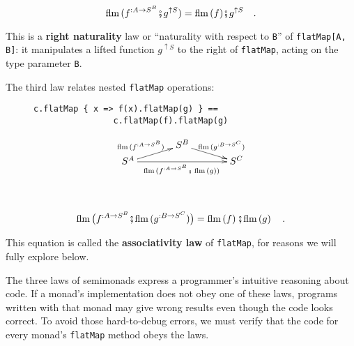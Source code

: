 \noindent \vspace{-0.35\baselineskip}
\begin{equation}
\text{flm}\,(f^{:A\rightarrow S^{B}}\bef g^{\uparrow S})=\text{flm}\,(f)\bef g^{\uparrow S}\quad.\label{eq:right-naturality-law-flatMap}
\end{equation}

\noindent This is a \textbf{right
naturality} law or \textsf{``}naturality with respect to \lstinline!B!\textsf{''}
of \lstinline!flatMap[A, B]!: it manipulates a lifted function $g^{\uparrow S}$
to the right of \lstinline!flatMap!, acting on the type parameter
\lstinline!B!.

The third law relates nested \lstinline!flatMap! operations:

\begin{wrapfigure}{l}{0.4\columnwidth}%
\vspace{-0.6\baselineskip}

\begin{lstlisting}
c.flatMap { x => f(x).flatMap(g) } ==
                c.flatMap(f).flatMap(g)
\end{lstlisting}
\vspace{0\baselineskip}
\[
\xymatrix{\xyScaleY{0.2pc}\xyScaleX{3pc} & S^{B}\ar[rd]\sp(0.5){~\ \text{flm}\,(g^{:B\rightarrow S^{C}})}\\
S^{A}\ar[ru]\sp(0.5){\text{flm}\,(f^{:A\rightarrow S^{B}})~~\ }\ar[rr]\sb(0.5){\text{flm}\,(f^{:A\rightarrow S^{B}}\bef\,\text{flm}\,(g))\,} &  & S^{C}
}
\]

\vspace{0.6\baselineskip}
\end{wrapfigure}%
~\vspace{-1.6\baselineskip}

\begin{equation}
\text{flm}\,\big(f^{:A\rightarrow S^{B}}\bef\text{flm}\,(g^{:B\rightarrow S^{C}})\big)=\text{flm}\left(f\right)\bef\text{flm}\left(g\right)\quad.\label{eq:associativity-law-flatMap}
\end{equation}

\vspace{-0.2\baselineskip}

This equation is called the \textbf{associativity law}
of \lstinline!flatMap!, for reasons we will fully explore below.

The three laws of semimonads express a programmer\textsf{'}s intuitive reasoning
about code. If a monad\textsf{'}s implementation does not obey one of these
laws, programs written with that monad may give wrong results even
though the code looks correct. To avoid those hard-to-debug errors,
we must verify that the code for every monad\textsf{'}s \lstinline!flatMap!
method obeys the laws. 

